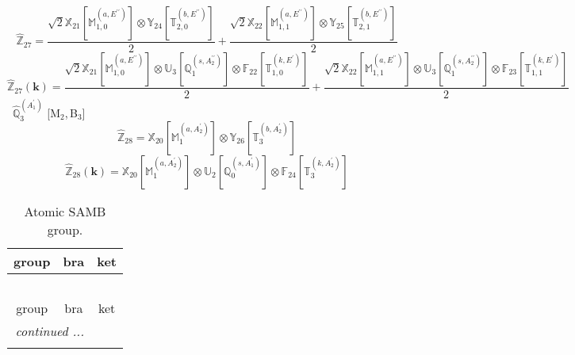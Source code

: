 \documentclass[fleqn,10pt,landscape]{article}
\begin{document}
\begin{itemize}
\begin{dmath*}
\hat{\mathbb{Z}}_{27}=\frac{\sqrt{2} \mathbb{X}_{21}[\mathbb{M}_{1,0}^{(a,E^{\prime\prime})}] \otimes\mathbb{Y}_{24}[\mathbb{T}_{2,0}^{(b,E^{\prime\prime})}]}{2} + \frac{\sqrt{2} \mathbb{X}_{22}[\mathbb{M}_{1,1}^{(a,E^{\prime\prime})}] \otimes\mathbb{Y}_{25}[\mathbb{T}_{2,1}^{(b,E^{\prime\prime})}]}{2}
\end{dmath*}
\begin{dmath*}
\hat{\mathbb{Z}}_{27}(\bm{k})=\frac{\sqrt{2} \mathbb{X}_{21}[\mathbb{M}_{1,0}^{(a,E^{\prime\prime})}] \otimes\mathbb{U}_{3}[\mathbb{Q}_{1}^{(s,A_{2}^{\prime\prime})}] \otimes\mathbb{F}_{22}[\mathbb{T}_{1,0}^{(k,E^{\prime})}]}{2} + \frac{\sqrt{2} \mathbb{X}_{22}[\mathbb{M}_{1,1}^{(a,E^{\prime\prime})}] \otimes\mathbb{U}_{3}[\mathbb{Q}_{1}^{(s,A_{2}^{\prime\prime})}] \otimes\mathbb{F}_{23}[\mathbb{T}_{1,1}^{(k,E^{\prime})}]}{2}
\end{dmath*}
\vspace{4mm}
\noindent {} $\,\,\,\hat{\mathbb{Q}}_{3}^{(A_{1}^{\prime})}$ [M$_{2}$,\,B$_{3}$]
\begin{dmath*}
\hat{\mathbb{Z}}_{28}=\mathbb{X}_{20}[\mathbb{M}_{1}^{(a,A_{2}^{\prime})}] \otimes\mathbb{Y}_{26}[\mathbb{T}_{3}^{(b,A_{2}^{\prime})}]
\end{dmath*}
\begin{dmath*}
\hat{\mathbb{Z}}_{28}(\bm{k})=\mathbb{X}_{20}[\mathbb{M}_{1}^{(a,A_{2}^{\prime})}] \otimes\mathbb{U}_{2}[\mathbb{Q}_{0}^{(s,A_{1}^{\prime})}] \otimes\mathbb{F}_{24}[\mathbb{T}_{3}^{(k,A_{2}^{\prime})}]
\end{dmath*}
\begin{center}
\renewcommand{\arraystretch}{1.3}
\begin{longtable}{c|c|c}
\caption{Atomic SAMB group.}
 \\
 \hline \hline
group & bra & ket \\ \hline \endfirsthead

\multicolumn{2}{l}{\tablename\ \thetable{}} \\
 \hline \hline
group & bra & ket \\ \hline \endhead

 \hline \hline
\multicolumn{2}{r}{\footnotesize\it continued ...} \\ \endfoot


\end{longtable}
\end{center}
\end{itemize}
\end{document}
